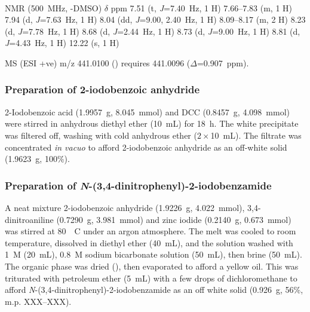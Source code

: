 \footnotesize\paragraph{}

 NMR (500~MHz, -DMSO) $\delta$ ppm
7.51 (t, \emph{J}=7.40~Hz, 1 H)
7.66--7.83 (m, 1 H)
7.94 (d, \emph{J}=7.63~Hz, 1 H)
8.04 (dd, \emph{J}=9.00, 2.40~Hz, 1 H)
8.09--8.17 (m, 2 H)
8.23 (d, \emph{J}=7.78~Hz, 1 H)
8.68 (d, \emph{J}=2.44~Hz, 1 H)
8.73 (d, \emph{J}=9.00~Hz, 1 H)
8.81 (d, \emph{J}=4.43~Hz, 1 H)
12.22 (s, 1 H)

MS (ESI +ve) m/z 441.0100 ()  requires 441.0096 ($\Delta$=0.907~ppm).

\normalsize

\subsubsection{Preparation of 2-iodobenzoic anhydride }
2-Iodobenzoic acid (1.9957~g, 8.045~mmol) and DCC (0.8457~g, 4.098~mmol) were stirred in anhydrous diethyl ether (10~mL) for 18~h. The white precipitate was filtered off, washing with cold anhydrous ether ($2\times$10~mL). The filtrate was concentrated \emph{in vacuo} to afford 2-iodobenzoic anhydride  as an off-white solid (1.9623~g, 100\%).


\subsubsection{Preparation of \emph{N}-(3,4-dinitrophenyl)-2-iodobenzamide \autocite{Shivani2007}}
A neat mixture 2-iodobenzoic anhydride  (1.9226~g, 4.022~mmol), 3,4-dinitroaniline (0.7290~g, 3.981~mmol) and zinc iodide (0.2140~g, 0.673~mmol) was stirred at 80~\degree~C under an argon atmosphere. The melt was cooled to room temperature, dissolved in diethyl ether (40~mL), and the solution washed with 1~\textsc{M}  (20~mL), 0.8~\textsc{M} sodium bicarbonate solution (50~mL), then brine (50~mL). The organic phase was dried (), then evaporated to afford a yellow oil. This was triturated with petroleum ether (5~mL) with a few drops of dichloromethane to afford \emph{N}-(3,4-dinitrophenyl)-2-iodobenzamide  as an off white solid (0.926~g, 56\%, m.p. XXX--XXX).

\footnotesize\paragraph{}

